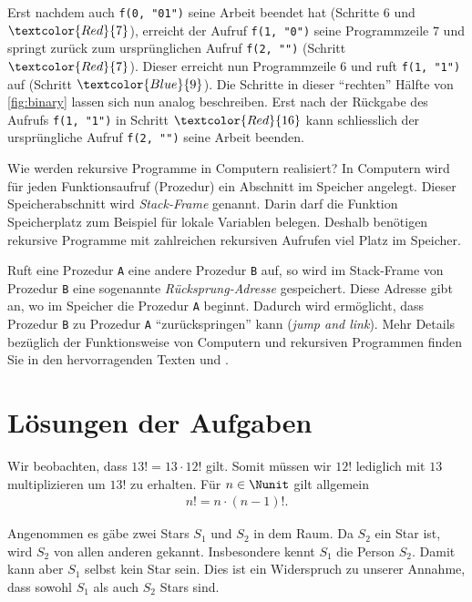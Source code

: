 \noindent
Erst nachdem auch \lstinline|f(0, "01")| seine Arbeit beendet hat (Schritte $6$ und $\textcolor{Red}{7}$), erreicht der Aufruf \lstinline|f(1, "0")| seine Programmzeile $7$ und springt zurück zum ursprünglichen Aufruf \lstinline|f(2, "")| (Schritt $\textcolor{Red}{7}$). Dieser erreicht nun Programmzeile $6$ und ruft \lstinline|f(1, "1")| auf (Schritt $\textcolor{Blue}{9}$). Die Schritte in dieser \enquote{rechten} Hälfte von \cref{fig:binary} lassen sich nun analog beschreiben. Erst nach der Rückgabe des Aufrufs \lstinline|f(1, "1")| in Schritt $\textcolor{Red}{16}$ kann schliesslich der ursprüngliche Aufruf \lstinline|f(2, "")| seine Arbeit beenden.

\clearpage
\begin{mysummary}{Wie werden rekursive Programme in Computern realisiert?}
In Computern wird für jeden Funktionsaufruf (Prozedur) ein Abschnitt im Speicher angelegt. Dieser Speicherabschnitt wird \textit{Stack-Frame} genannt. Darin darf die Funktion Speicherplatz zum Beispiel für lokale Variablen belegen. Deshalb benötigen rekursive Programme mit zahlreichen rekursiven Aufrufen viel Platz im Speicher.

Ruft eine Prozedur \lstinline|A| eine andere Prozedur \lstinline|B| auf, so wird im Stack-Frame von Prozedur \lstinline|B| eine sogenannte \textit{Rücksprung-Adresse} gespeichert. Diese Adresse gibt an, wo im Speicher die Prozedur \lstinline|A| beginnt. Dadurch wird ermöglicht, dass Prozedur \lstinline|B| zu Prozedur \lstinline|A| \enquote{zurückspringen} kann (\textit{jump and link}). Mehr Details bezüglich der Funktionsweise von Computern und rekursiven Programmen finden Sie in den hervorragenden Texten \cite{Malvino} und \cite{Sauter}.
\end{mysummary}

\clearpage
\section{Lösungen der Aufgaben}
\begin{myanswer}[myexercise:0301]
Wir beobachten, dass $13! = 13\cdot 12!$ gilt. Somit müssen wir $12!$ lediglich mit $13$ multiplizieren um $13!$ zu erhalten. Für $n\in\Nunit$ gilt allgemein
\begin{align*}
    n! = n\cdot (n-1)!.
\end{align*}
\end{myanswer}


\begin{myanswer}[myexercise:0350]
Angenommen es gäbe zwei Stars $S_1$ und $S_2$ in dem Raum. Da $S_2$ ein Star ist, wird $S_2$ von allen anderen gekannt. Insbesondere kennt $S_1$ die Person $S_2$. Damit kann aber $S_1$ selbst kein Star sein. Dies ist ein Widerspruch zu unserer Annahme, dass sowohl $S_1$ als auch $S_2$ Stars sind.
\end{myanswer}


